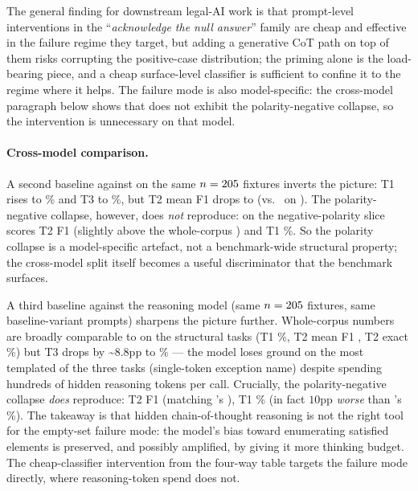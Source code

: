 The general finding for downstream legal-AI work is that
prompt-level interventions in the ``\emph{acknowledge the null
answer}'' family are cheap and effective in the failure regime
they target, but adding a generative CoT path on top of them
risks corrupting the positive-case distribution; the priming
alone is the load-bearing piece, and a cheap surface-level
classifier is sufficient to confine it to the regime where it
helps. The failure mode is also model-specific: the cross-model
paragraph below shows that \statBenchmarkLlmAltModel{} does not
exhibit the polarity-negative collapse, so the intervention is
unnecessary on that model.

\paragraph{Cross-model comparison.} A second baseline against
\statBenchmarkLlmAltModel{} on the same $n =
205{}$ fixtures inverts the picture: T1 rises
to \statBenchmarkLlmAltTone{}\% and T3 to
\statBenchmarkLlmAltTthree{}\%, but T2 mean F1 drops to
\statBenchmarkLlmAltTtwoFOne{} (vs.\ \statBenchmarkLlmTtwoFOne{}
on \statBenchmarkLlmModel{}). The polarity-negative collapse,
however, does \emph{not} reproduce: on
\statBenchmarkLlmAltModel{} the negative-polarity slice scores
T2 F1 \statBenchmarkLlmAltNegPolarFOne{} (slightly above the
whole-corpus \statBenchmarkLlmAltTtwoFOne{}) and T1
\statBenchmarkLlmAltNegPolarTone{}\%. So the
\statBenchmarkLlmModel{} polarity collapse is a
model-specific artefact, not a benchmark-wide structural
property; the cross-model split itself becomes a useful
discriminator that the benchmark surfaces.

A third baseline against the reasoning model
\statBenchmarkLlmReasonModel{} (same $n =
205{}$ fixtures, same baseline-variant
prompts) sharpens the picture further. Whole-corpus numbers are
broadly comparable to \statBenchmarkLlmModel{} on the structural
tasks (T1 \statBenchmarkLlmReasonTone{}\%, T2 mean F1
\statBenchmarkLlmReasonTtwoFOne{}, T2 exact
\statBenchmarkLlmReasonTtwo{}\%) but T3 drops by
\textasciitilde$8.8$pp to
\statBenchmarkLlmReasonTthree{}\% --- the model loses ground on
the most templated of the three tasks (single-token exception
name) despite spending hundreds of hidden reasoning tokens per
call. Crucially, the polarity-negative collapse \emph{does}
reproduce: T2 F1 \statBenchmarkLlmReasonNegPolarFOne{} (matching
\statBenchmarkLlmModel{}'s
\statBenchmarkLlmNegPolarFOne{}), T1
\statBenchmarkLlmReasonNegPolarTone{}\% (in fact $10$pp
\emph{worse} than \statBenchmarkLlmModel{}'s
\statBenchmarkLlmNegPolarTone{}\%). The takeaway is that hidden
chain-of-thought reasoning is not the right tool for the
empty-set failure mode: the model's bias toward enumerating
satisfied elements is preserved, and possibly amplified, by
giving it more thinking budget. The cheap-classifier
intervention from the four-way table targets the failure mode
directly, where reasoning-token spend does not.

